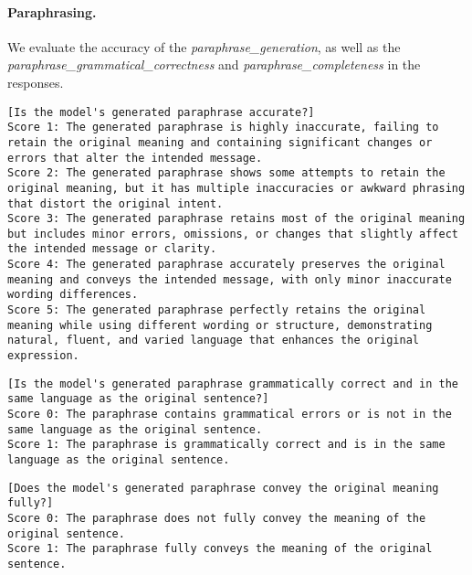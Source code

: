 \paragraph{Paraphrasing.} We evaluate the accuracy of the \emph{paraphrase\_generation}, as well as the \hbox{\emph{paraphrase\_grammatical\_correctness}} and \emph{paraphrase\_completeness} in the responses.
\begin{lstlisting}[label=lst:judge_rubrics_paraph1,caption={Rubric used for the \emph{paraphrase\_generation} criterion.}]
[Is the model's generated paraphrase accurate?]
Score 1: The generated paraphrase is highly inaccurate, failing to retain the original meaning and containing significant changes or errors that alter the intended message.
Score 2: The generated paraphrase shows some attempts to retain the original meaning, but it has multiple inaccuracies or awkward phrasing that distort the original intent.
Score 3: The generated paraphrase retains most of the original meaning but includes minor errors, omissions, or changes that slightly affect the intended message or clarity.
Score 4: The generated paraphrase accurately preserves the original meaning and conveys the intended message, with only minor inaccurate wording differences.
Score 5: The generated paraphrase perfectly retains the original meaning while using different wording or structure, demonstrating natural, fluent, and varied language that enhances the original expression.
\end{lstlisting}
\begin{lstlisting}[label=lst:judge_rubrics_paraph2,caption={Rubric used for the \emph{paraphrase\_grammatical\_correctness} criterion.}]
[Is the model's generated paraphrase grammatically correct and in the same language as the original sentence?]
Score 0: The paraphrase contains grammatical errors or is not in the same language as the original sentence.
Score 1: The paraphrase is grammatically correct and is in the same language as the original sentence.
\end{lstlisting}
\begin{lstlisting}[label=lst:paraph3,caption={Rubric used for the \emph{paraphrase\_completeness} criterion.}]
[Does the model's generated paraphrase convey the original meaning fully?]
Score 0: The paraphrase does not fully convey the meaning of the original sentence.
Score 1: The paraphrase fully conveys the meaning of the original sentence.
\end{lstlisting}

\newpage
